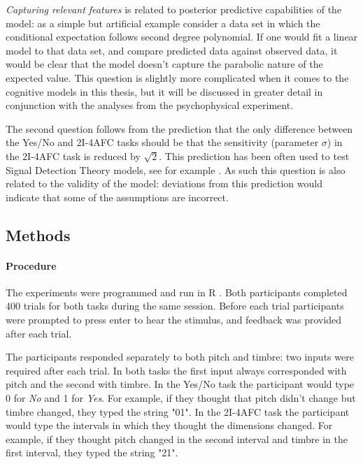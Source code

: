 \documentclass{article}\usepackage{knitr}
\begin{document}
\textit{Capturing relevant features} is related to posterior predictive capabilities of the model: as a simple but artificial example consider a data set in which the conditional expectation follows second degree polynomial. If one would fit a linear model to that data set, and compare predicted data against observed data, it would be clear that the model doesn't capture the parabolic nature of the expected value. This question is slightly more complicated when it comes to the cognitive models in this thesis, but it will be discussed in greater detail in conjunction with the analyses from the psychophysical experiment.

The second question follows from the prediction that the only difference between the Yes/No and 2I-4AFC tasks should be that the sensitivity (parameter $\sigma$) in the 2I-4AFC task is reduced by $\sqrt{2}$. This prediction has been often used to test Signal Detection Theory models, see for example \citet{wickens2002}. As such this question is also related to the validity of the model: deviations from this prediction would indicate that some of the assumptions are incorrect.  
 
\subsection{Methods}

\paragraph{Procedure}

The experiments were programmed and run in R \citep{r_language}. Both participants completed 400 trials for both tasks during the same session.  Before each trial participants were prompted to press enter to hear the stimulus, and feedback was provided after each trial.

The participants responded separately to both pitch and timbre: two inputs were required after each trial. In both tasks the first input always corresponded with pitch and the second with timbre. In the Yes/No task the participant would type 0 for \textit{No} and 1 for \textit{Yes}. For example, if they thought that pitch didn't change but timbre changed, they typed the string "01". In the 2I-4AFC task the participant would type the intervals in which they thought the dimensions changed. For example, if they thought pitch changed in the second interval and timbre in the first interval, they typed the string "21". 
\end{document}
